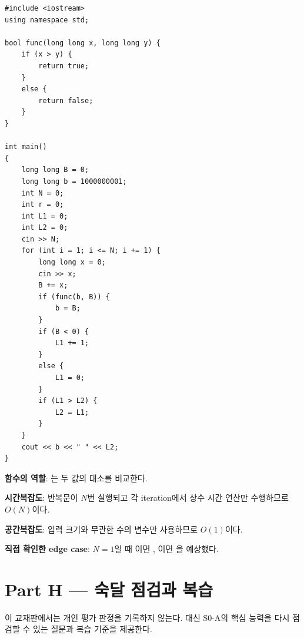 \begin{answerbox}[학습자 제출 답안]
\begin{lstlisting}
#include <iostream>
using namespace std;

bool func(long long x, long long y) {
    if (x > y) {
        return true;
    }
    else {
        return false;
    }
}

int main()
{
    long long B = 0;
    long long b = 1000000001;
    int N = 0;
    int r = 0;
    int L1 = 0;
    int L2 = 0;
    cin >> N;
    for (int i = 1; i <= N; i += 1) {
        long long x = 0;
        cin >> x;
        B += x;
        if (func(b, B)) {
            b = B;
        }
        if (B < 0) {
            L1 += 1;
        }
        else {
            L1 = 0;
        }
        if (L1 > L2) {
            L2 = L1;
        }
    }
    cout << b << " " << L2;
}
\end{lstlisting}

\textbf{함수의 역할}: 는 두 값의 대소를 비교한다.

\textbf{시간복잡도}: 반복문이 $N$번 실행되고 각 iteration에서 상수 시간 연산만 수행하므로 $O(N)$이다.

\textbf{공간복잡도}: 입력 크기와 무관한 수의 변수만 사용하므로 $O(1)$이다.

\textbf{직접 확인한 edge case}: $N=1$일 때 이면 , 이면 을 예상했다.
\end{answerbox}

\section{Part H --- 숙달 점검과 복습}

이 교재판에서는 개인 평가 판정을 기록하지 않는다. 대신 S0-A의 핵심 능력을 다시 점검할 수 있는 질문과 복습 기준을 제공한다.

